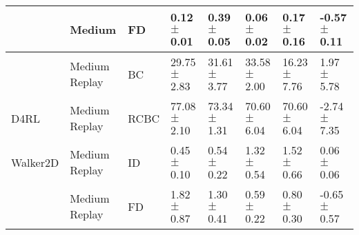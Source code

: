 \begin{table*}
\begin{tabular}{l l l l l l l l}
         &        Medium &   FD &   0.12 $\pm$ 0.01 &   0.39 $\pm$ 0.05 &   0.06 $\pm$ 0.02 &   0.17 $\pm$ 0.16 & \textcolor[rgb]{0.00,0.25,0.00}{-0.57 $\pm$ 0.11} \\
    \midrule
         & Medium Replay &   BC &  29.75 $\pm$ 2.83 &  31.61 $\pm$ 3.77 &  33.58 $\pm$ 2.00 &  16.23 $\pm$ 7.76 &  \textcolor[rgb]{0.00,0.50,0.00}{1.97 $\pm$ 5.78} \\
    D4RL & Medium Replay & RCBC &  77.08 $\pm$ 2.10 &  73.34 $\pm$ 1.31 &  70.60 $\pm$ 6.04 &  70.60 $\pm$ 6.04 & \textcolor[rgb]{1.00,0.00,0.00}{-2.74 $\pm$ 7.35} \\
Walker2D & Medium Replay &   ID &   0.45 $\pm$ 0.10 &   0.54 $\pm$ 0.22 &   1.32 $\pm$ 0.54 &   1.52 $\pm$ 0.66 &  \textcolor[rgb]{0.00,0.00,0.00}{0.06 $\pm$ 0.06} \\
         & Medium Replay &   FD &   1.82 $\pm$ 0.87 &   1.30 $\pm$ 0.41 &   0.59 $\pm$ 0.22 &   0.80 $\pm$ 0.30 & \textcolor[rgb]{0.00,0.29,0.00}{-0.65 $\pm$ 0.57} \\
    \midrule
    \bottomrule
  \end{tabular}
\end{table*}
